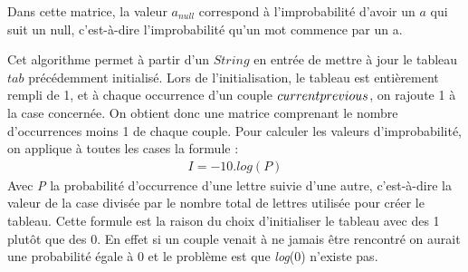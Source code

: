 \documentclass[french,12pt]{article}
\begin{document}
       \newline
       \newpage
       \indent Dans cette matrice, la valeur ${a}_{null}$ correspond à l'improbabilité d'avoir un $a$ qui suit un null, c'est-à-dire l'improbabilité qu'un mot commence par un a.  
        \newline
            
          
       
       \indent Cet algorithme permet à partir d'un $String$ en entrée de mettre à jour le tableau $tab$ précédemment initialisé. Lors de l'initialisation, le tableau est entièrement rempli de 1, et à chaque occurrence d'un couple $current\-previous$, on rajoute 1 à la case concernée. On obtient donc une matrice comprenant le nombre d'occurrences moins 1 de chaque couple. Pour calculer les valeurs d'improbabilité, on applique à toutes les cases la formule : 
        \newline
        \begin{align}
            I = -10.log(P)
        \end{align}
          \newline
         \indent Avec \textit{P} la probabilité d'occurrence d'une lettre suivie d'une autre, c'est-à-dire la valeur de la case divisée par le nombre total de lettres utilisée pour créer le tableau. Cette formule est la raison du choix d'initialiser le tableau avec des 1 plutôt que des 0. En effet si un couple venait à ne jamais être rencontré on aurait une probabilité égale à 0 et le problème est que \textit{log}(0) n'existe pas.  
       
\end{document}
